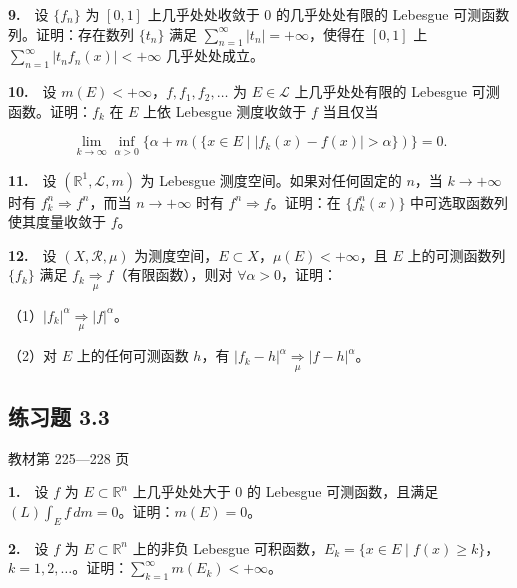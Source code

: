 \documentclass[11pt,a4paper]{article}
\begin{document}
\par{}\noindent \textbf{9.}　设 \(\{f_n\}\) 为 \([0,1]\) 上几乎处处收敛于 \(0\) 的几乎处处有限的 Lebesgue 可测函数列。证明：存在数列 \(\{t_n\}\) 满足 \(\sum_{n=1}^\infty|t_n|=+\infty\)，使得在 \([0,1]\) 上 \(\sum_{n=1}^\infty|t_nf_n(x)|<+\infty\) 几乎处处成立。

\par{}\noindent \textbf{10.}　设 \(m(E)<+\infty\)，\(f,f_1,f_2,\ldots\) 为 \(E\in\mathcal L\) 上几乎处处有限的 Lebesgue 可测函数。证明：\(f_k\) 在 \(E\) 上依 Lebesgue 测度收敛于 \(f\) 当且仅当

\[
\lim_{k\to\infty}\inf_{\alpha>0}\{\alpha+m(\{x\in E\mid |f_k(x)-f(x)|>\alpha\})\}=0.
\]

\par{}\noindent \textbf{11.}　设 \((\mathbb R^1,\mathcal L,m)\) 为 Lebesgue 测度空间。如果对任何固定的 \(n\)，当 \(k\to+\infty\) 时有 \(f_k^n\Rightarrow f^n\)，而当 \(n\to+\infty\) 时有 \(f^n\Rightarrow f\)。证明：在 \(\{f_k^n(x)\}\) 中可选取函数列使其度量收敛于 \(f\)。

\par{}\noindent \textbf{12.}　设 \((X,\mathcal R,\mu)\) 为测度空间，\(E\subset X\)，\(\mu(E)<+\infty\)，且 \(E\) 上的可测函数列 \(\{f_k\}\) 满足 \(f_k\underset{\mu}{\Rightarrow} f\)（有限函数），则对 \(\forall\alpha>0\)，证明：

（1）\(|f_k|^\alpha\underset{\mu}{\Rightarrow} |f|^\alpha\)。

（2）对 \(E\) 上的任何可测函数 \(h\)，有 \(|f_k-h|^\alpha\underset{\mu}{\Rightarrow} |f-h|^\alpha\)。


\hypertarget{ex3}{}\subsection*{练习题 3.3}
\noindent 教材第 225—228 页

\par{}\noindent \textbf{1.}　设 \(f\) 为 \(E\subset\mathbb R^n\) 上几乎处处大于 \(0\) 的 Lebesgue 可测函数，且满足 \((L)\int_E f\,dm=0\)。证明：\(m(E)=0\)。

\par{}\noindent \textbf{2.}　设 \(f\) 为 \(E\subset\mathbb R^n\) 上的非负 Lebesgue 可积函数，\(E_k=\{x\in E\mid f(x)\ge k\}\)，\(k=1,2,\ldots\)。证明：\(\sum_{k=1}^\infty m(E_k)<+\infty\)。
\end{document}
